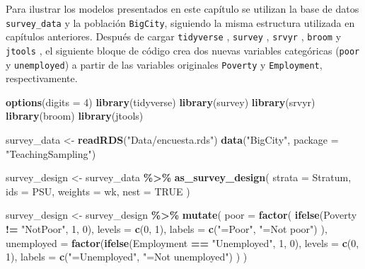 \documentclass[
  spanish,
  12pt,
]{book}
\newenvironment{Shaded}{\begin{snugshade}}{\end{snugshade}}
\newcommand{\AttributeTok}[1]{\textcolor[rgb]{0.13,0.29,0.53}{#1}}
\newcommand{\ConstantTok}[1]{\textcolor[rgb]{0.56,0.35,0.01}{#1}}
\newcommand{\DecValTok}[1]{\textcolor[rgb]{0.00,0.00,0.81}{#1}}
\newcommand{\FunctionTok}[1]{\textcolor[rgb]{0.13,0.29,0.53}{\textbf{#1}}}
\newcommand{\NormalTok}[1]{#1}
\newcommand{\OtherTok}[1]{\textcolor[rgb]{0.56,0.35,0.01}{#1}}
\newcommand{\SpecialCharTok}[1]{\textcolor[rgb]{0.81,0.36,0.00}{\textbf{#1}}}
\newcommand{\StringTok}[1]{\textcolor[rgb]{0.31,0.60,0.02}{#1}}
\begin{document}
Para ilustrar los modelos presentados en este capítulo se utilizan la base de datos \texttt{survey\_data} y la población \texttt{BigCity}, siguiendo la misma estructura utilizada en capítulos anteriores. Después de cargar \texttt{tidyverse} \citep{tidyverse2026}, \texttt{survey} \citep{Lumley2024}, \texttt{srvyr} \citep{Freedman2024}, \texttt{broom} \citep{broom2026} y \texttt{jtools} \citep{jtools2026}, el siguiente bloque de código crea dos nuevas variables categóricas (\texttt{poor} y \texttt{unemployed}) a partir de las variables originales \texttt{Poverty} y \texttt{Employment}, respectivamente.

\begin{Shaded}
\begin{Highlighting}[]
\FunctionTok{options}\NormalTok{(}\AttributeTok{digits =} \DecValTok{4}\NormalTok{)}
\FunctionTok{library}\NormalTok{(tidyverse)}
\FunctionTok{library}\NormalTok{(survey)}
\FunctionTok{library}\NormalTok{(srvyr)}
\FunctionTok{library}\NormalTok{(broom)}
\FunctionTok{library}\NormalTok{(jtools)}

\NormalTok{survey\_data }\OtherTok{\textless{}{-}} \FunctionTok{readRDS}\NormalTok{(}\StringTok{"Data/encuesta.rds"}\NormalTok{)}
\FunctionTok{data}\NormalTok{(}\StringTok{"BigCity"}\NormalTok{, }\AttributeTok{package =} \StringTok{"TeachingSampling"}\NormalTok{)}

\NormalTok{survey\_design }\OtherTok{\textless{}{-}}\NormalTok{ survey\_data }\SpecialCharTok{\%\textgreater{}\%}
  \FunctionTok{as\_survey\_design}\NormalTok{(}
    \AttributeTok{strata =}\NormalTok{ Stratum,}
    \AttributeTok{ids =}\NormalTok{ PSU,}
    \AttributeTok{weights =}\NormalTok{ wk,}
    \AttributeTok{nest =} \ConstantTok{TRUE}
\NormalTok{  )}

\NormalTok{survey\_design }\OtherTok{\textless{}{-}}\NormalTok{ survey\_design }\SpecialCharTok{\%\textgreater{}\%}
  \FunctionTok{mutate}\NormalTok{(}
    \AttributeTok{poor =} \FunctionTok{factor}\NormalTok{(}
      \FunctionTok{ifelse}\NormalTok{(Poverty }\SpecialCharTok{!=} \StringTok{"NotPoor"}\NormalTok{, }\DecValTok{1}\NormalTok{, }\DecValTok{0}\NormalTok{),}
      \AttributeTok{levels =} \FunctionTok{c}\NormalTok{(}\DecValTok{0}\NormalTok{, }\DecValTok{1}\NormalTok{),}
      \AttributeTok{labels =} \FunctionTok{c}\NormalTok{(}\StringTok{"=Poor"}\NormalTok{, }\StringTok{"=Not poor"}\NormalTok{)}
\NormalTok{    ),}
    \AttributeTok{unemployed =} \FunctionTok{factor}\NormalTok{(}\FunctionTok{ifelse}\NormalTok{(Employment }\SpecialCharTok{==} \StringTok{"Unemployed"}\NormalTok{, }\DecValTok{1}\NormalTok{, }\DecValTok{0}\NormalTok{),}
      \AttributeTok{levels =} \FunctionTok{c}\NormalTok{(}\DecValTok{0}\NormalTok{, }\DecValTok{1}\NormalTok{),}
      \AttributeTok{labels =} \FunctionTok{c}\NormalTok{(}\StringTok{"=Unemployed"}\NormalTok{, }\StringTok{"=Not unemployed"}\NormalTok{)}
\NormalTok{    )}
\NormalTok{  )}
\end{Highlighting}
\end{Shaded}
\end{document}

